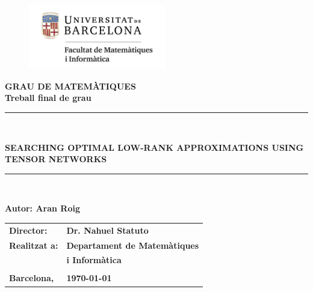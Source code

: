 \documentclass[11pt,a4paper,openright,oneside]{book}
\numberwithin{equation}{section}
\begin{document}

\thispagestyle{empty}

\begin{titlepage}
\begin{center}
\begin{figure}[htb]
\begin{center}
\includegraphics[width=6cm]{matematiquesinformatica-pos-rgb.png}
\end{center}
\end{figure}

\vspace*{1cm}
\textbf{\LARGE GRAU DE MATEM\`{A}TIQUES} \\
\vspace*{.5cm}
\textbf{\LARGE Treball final de grau} \\

\vspace*{1.5cm}
\rule{16cm}{0.1mm}\\
\begin{Huge}
\textbf{SEARCHING OPTIMAL LOW-RANK APPROXIMATIONS USING TENSOR NETWORKS} \\
\end{Huge}
\rule{16cm}{0.1mm}\\

\vspace{1cm}

\begin{flushright}
\textbf{\LARGE Autor: Aran Roig}

\vspace*{2cm}

\renewcommand{\arraystretch}{1.5}
\begin{tabular}{ll}
\textbf{\Large Director:} & \textbf{\Large Dr. Nahuel Statuto} \\
\textbf{\Large Realitzat a:} & \textbf{\Large  Departament de Matemàtiques   } \\
 & \textbf{\Large i Informàtica} \\
\\
\textbf{\Large Barcelona,} & \textbf{\Large \today }
\end{tabular}

\end{flushright}

\end{center}



\end{titlepage}
\end{document}
